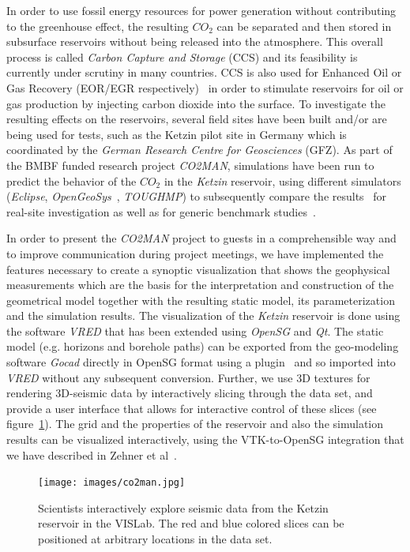 \documentclass[twocolumn]{svjour3}          %
\begin{document}
In order to use fossil energy resources for power generation without contributing to the greenhouse effect, the resulting $CO_{2}$ can be separated and then stored in subsurface reservoirs without being released into the atmosphere. This overall process is called \emph{Carbon Capture and Storage} (CCS) and its feasibility is currently under scrutiny in many countries. CCS is also used for Enhanced Oil or Gas Recovery (EOR/EGR respectively)~\cite{Singh20113446} in order to stimulate reservoirs for oil or gas production by injecting carbon dioxide into the surface. To investigate the resulting effects on the reservoirs, several field sites have been built and/or are being used for tests, such as the Ketzin pilot site in Germany which is coordinated by the \emph{German Research Centre for Geosciences} (GFZ). As part of the BMBF funded research project \emph{CO2MAN}, simulations have been run to predict the behavior of the $CO_{2}$ in the \emph{Ketzin} reservoir, using different simulators (\emph{Eclipse}, \emph{OpenGeoSys}~\cite{Wang2014}, \emph{TOUGHMP}) to subsequently compare the results~\cite{Kempka2013418} for real-site investigation as well as for generic benchmark studies~\cite{Kolditz2012613}.

In order to present the \emph{CO2MAN} project to guests in a comprehensible way and to improve communication during project meetings, we have implemented the features necessary to create a synoptic visualization that shows the geophysical measurements which are the basis for the interpretation and construction of the geometrical model together with the resulting static model, its parameterization and the simulation results. The visualization of the \emph{Ketzin} reservoir is done using the software \emph{VRED} that has been extended using \emph{OpenSG} and \emph{Qt}. The static model (e.g. horizons and borehole paths) can be exported from the geo-modeling software \emph{Gocad} directly in OpenSG format using a plugin~\cite{zehner:gocad} and so imported into \emph{VRED} without any subsequent conversion. Further, we use 3D textures for rendering 3D-seismic data by interactively slicing through the data set, and provide a user interface that allows for interactive control of these slices (see figure~\ref{fig:co2man}). The grid and the properties of the reservoir and also the simulation results can be visualized interactively, using the VTK-to-OpenSG integration that we have described in Zehner et al~\cite{zehner:uncertainty}.

\begin{figure}[htb]
  \texttt{[image: images/co2man.jpg]}
\caption{Scientists interactively explore seismic data from the Ketzin reservoir in the VISLab. The red and blue colored slices can be positioned at arbitrary locations in the data set.}
\label{fig:co2man}
\end{figure}
\end{document}
